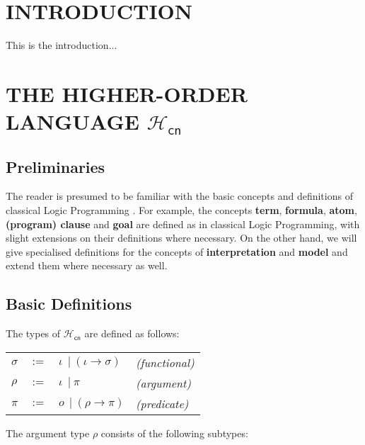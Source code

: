 \documentclass[inscr,ack,preface]{dithesis}
\theoremstyle{definition}
\newcommand{\hcn}{$\mathcal{H}_\mathsf{cn}$}
\begin{document}
\frontmatter

\mainmatter

\chapter{INTRODUCTION}

This is the introduction...

\chapter{THE HIGHER-ORDER LANGUAGE \hcn}

\section{Preliminaries}
The reader is presumed to be familiar with the basic concepts and definitions of classical Logic Programming \cite{Lloyd:1987:FLP:39279}. For example, the concepts \textbf{term}, \textbf{formula}, \textbf{atom}, \textbf{(program) clause} and \textbf{goal} are defined as in classical Logic Programming, with slight extensions on their definitions where necessary. On the other hand, we will give specialised definitions for the concepts of \textbf{interpretation} and \textbf{model} and extend them where necessary as well.

\section{Basic Definitions}

 The types of \hcn{} are defined as follows:

\begin{center}
  \begin{tabular}{llll}
    $\sigma$ & $:=$ & $\iota ~~|~ \left( \iota \rightarrow \sigma \right)$ & \hspace*{2.5cm} \emph{(functional)} \\
    $\rho$   & $:=$ & $\iota ~~|~ \pi$ & \hspace*{2.5cm} \emph{(argument)} \\
    $\pi$    & $:=$ & $o ~~|~ \left( \rho \rightarrow \pi \right)$ & \hspace*{2.5cm} \emph{(predicate)} \\
  \end{tabular}
\end{center}

The argument type $\rho$ consists of the following subtypes:
\end{document}
